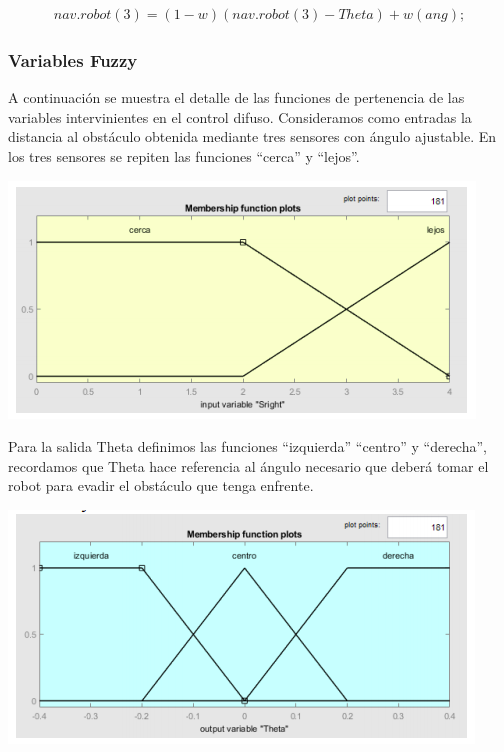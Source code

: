 \begin{equation}\boxed{
\begin{array}{rcl}
nav.robot(3)=(1-w)(nav.robot(3)-Theta) + w(ang);
\end{array}}
\end{equation}

\subsubsection{Variables Fuzzy}

A continuación se muestra el detalle de las funciones de pertenencia de las variables intervinientes en el control difuso. 
Consideramos como entradas la distancia al obstáculo obtenida mediante tres sensores con ángulo ajustable. En los tres sensores se repiten las funciones “cerca” y “lejos”.\par

\begin{center}
    \includegraphics[scale=0.5]{Tesis/Capitulos/04_CAPITULO_2/img/varfuzzy1.png}
\end{center}

Para la salida Theta definimos las funciones “izquierda” “centro” y “derecha”, recordamos que Theta hace referencia al ángulo necesario que deberá tomar el robot para evadir el obstáculo que tenga enfrente.

\begin{center}
    \includegraphics[scale=0.5]{Tesis/Capitulos/04_CAPITULO_2/img/varfuzzy2.png}
\end{center}


